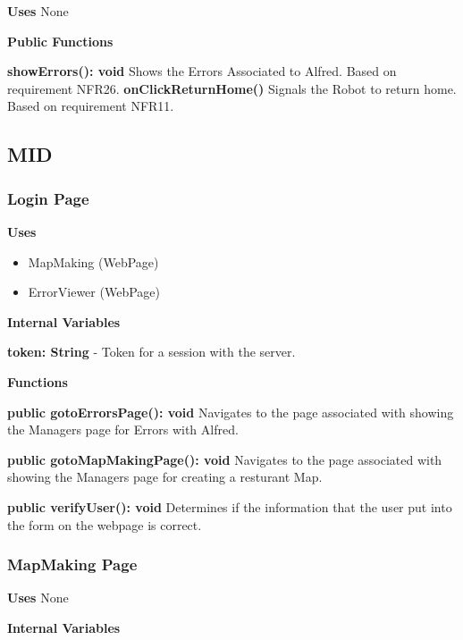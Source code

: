 \documentclass [10pt]{article}
\begin{document}
\textbf{Uses}
None

\textbf{Public Functions}

\textbf{ showErrors(): void}
Shows the Errors Associated to Alfred. Based on requirement NFR26.
\textbf{onClickReturnHome()}
Signals the Robot to return home. Based on requirement NFR11.



\subsection{MID}


\subsubsection{Login Page}

\textbf{Uses}
\begin{itemize}
	\item MapMaking (WebPage)
	\item ErrorViewer (WebPage)
\end{itemize}


\textbf{Internal Variables}

\textbf{token: String} - Token for a session with the server.


\textbf{Functions}

\textbf{public gotoErrorsPage(): void}
Navigates to the page associated with showing the Managers page for Errors with Alfred.

\textbf{public gotoMapMakingPage(): void}
Navigates to the page associated with showing the Managers page for creating a resturant Map.

\textbf{public verifyUser(): void}
Determines if the information that the user put into the form on the webpage is correct.


\subsubsection{MapMaking Page}

\textbf{Uses}
None

\textbf{Internal Variables}
\end{document}
